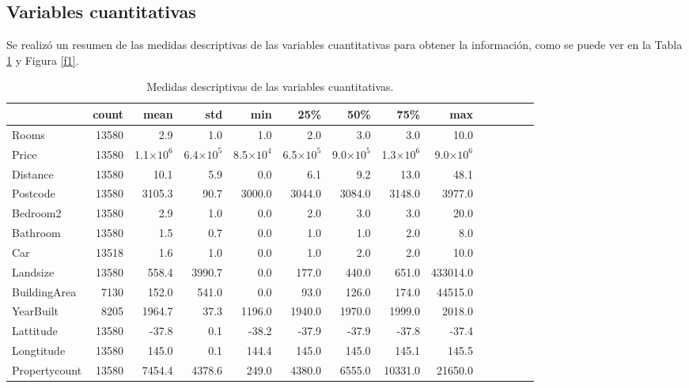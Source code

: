 \subsection*{Variables cuantitativas}
Se realizó un resumen de las medidas descriptivas de las variables cuantitativas para obtener la información, como se puede ver en la Tabla \ref{t.medidas} y Figura \ref{f1}.




\begin{table}[h]
  \small
  \centering
  \caption{Medidas descriptivas de las variables cuantitativas.}
  \label{t.medidas}
  \begin{tabular}{l|rrrrrrrrrrrrr}
  \hline\hline
    & count & mean & std & min & 25\% & 50\% & 75\% & max \\
    \hline
    Rooms & 13580 & 2.9 & 1.0 & 1.0 & 2.0 & 3.0 & 3.0 & 10.0 \\
    
    Price & 13580 & 1.1$\times 10^6$ & 6.4$\times 10^5$ & 8.5$\times 10^4$ & 6.5$\times 10^5$ & 9.0$\times 10^5$ & 1.3$\times 10^6$ & 9.0$\times 10^6$ \\
    
    Distance & 13580 & 10.1 & 5.9 & 0.0 & 6.1 & 9.2 & 13.0 & 48.1 \\
    
    Postcode & 13580 & 3105.3 & 90.7 & 3000.0 & 3044.0 & 3084.0 & 3148.0 & 3977.0 \\
    
    Bedroom2 & 13580 & 2.9 & 1.0 & 0.0 & 2.0 & 3.0 & 3.0 & 20.0 \\
    
    Bathroom & 13580 & 1.5 & 0.7 & 0.0 & 1.0 & 1.0 & 2.0 & 8.0 \\
    
    Car & 13518 & 1.6 & 1.0 & 0.0 & 1.0 & 2.0 & 2.0 & 10.0 \\
    
    Landsize & 13580 & 558.4 & 3990.7 & 0.0 & 177.0 & 440.0 & 651.0 & 433014.0 \\
    
    BuildingArea & 7130 & 152.0 & 541.0 & 0.0 & 93.0 & 126.0 & 174.0 & 44515.0 \\
    
    YearBuilt & 8205 & 1964.7 & 37.3 & 1196.0 & 1940.0 & 1970.0 & 1999.0 & 2018.0 \\
    
    Lattitude & 13580 & -37.8 & 0.1 & -38.2 & -37.9 & -37.9 & -37.8 & -37.4 \\
    
    Longtitude & 13580 & 145.0 & 0.1 & 144.4 & 145.0 & 145.0 & 145.1 & 145.5 \\
    
    Propertycount & 13580 & 7454.4 & 4378.6 & 249.0 & 4380.0 & 6555.0 & 10331.0 & 21650.0 \\
    \hline\hline
  \end{tabular}
\end{table}


